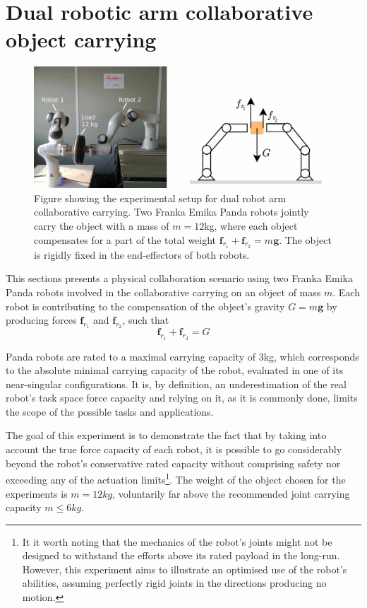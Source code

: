 \section{Dual robotic arm collaborative object carrying}
\label{ch:robot_robot_carrying}

\begin{figure}[!h]
    \centering
    \includegraphics[width=0.9\linewidth]{Papers/images/real_robots_schema_exp1.jpg}
    \caption{Figure showing the experimental setup for dual robot arm collaborative carrying. Two Franka Emika Panda robots jointly carry the object with a mass of $m=12$kg, where each object compensates for a part of the total weight $\bm{f}_{r_1} + \bm{f}_{r_2} = m\bm{g}$. The object is rigidly fixed in the end-effectors of both robots.}
    \label{fig:exp1_real_schema}
\end{figure}


This sections presents a physical collaboration scenario using two {Franka Emika Panda} robots involved in the collaborative carrying on an object of mass $m$. Each robot is contributing to the compensation of the object's gravity $G=m\bm{g}$ by producing forces $\bm{f}_{r_1}$ and $\bm{f}_{r_2}$, such that
\begin{equation}
    \bm{f}_{r_1} + \bm{f}_{r_2} = G
\end{equation}

Panda robots are rated to a maximal carrying capacity of 3kg, which corresponds to the absolute minimal carrying capacity of the robot, evaluated in one of its near-singular configurations. It is, by definition, an underestimation of the real robot's task space force capacity and relying on it, as it is commonly done, limits the scope of the possible tasks and applications.

The goal of this experiment is to demonstrate the fact that by taking into account the true force capacity of each robot, it is possible to go considerably beyond the robot's conservative rated capacity without comprising safety nor exceeding any of the actuation limits\footnote{It it worth noting that the mechanics of the robot's joints might not be designed to withstand the efforts above its rated payload in the long-run. However, this experiment aims to illustrate an optimised use of the robot's abilities, assuming perfectly rigid joints in the directions producing no motion.}. The weight of the object chosen for the experiments is $m=12kg$, voluntarily far above the recommended joint carrying capacity $ m\le 6kg$. 

